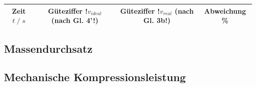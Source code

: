     \begin{table}
        \centering
        \begin{tabular}{c c c c}
        \toprule
        Zeit $t\;/\;s$ & Güteziffer !$v_{ideal}$ (nach Gl. 4'!) & Güteziffer !$v_{real}$ (nach Gl. 3b!) & Abweichung \% \\
        \midrule
        
        \end{tabular}
    \end{table}
    \subsection{Massendurchsatz}
    \subsection{Mechanische Kompressionsleistung}
    
